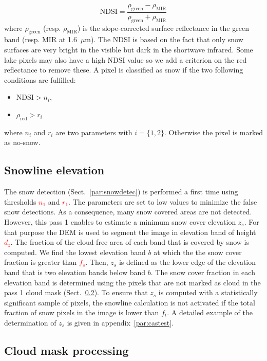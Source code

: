 \documentclass[a4paper]{article}
\begin{document}
\begin{equation}
\mathrm{NDSI} = \frac{\rho_\mathrm{green}-\rho_\mathrm{MIR}}{\rho_\mathrm{green}+\rho_\mathrm{MIR}}
\end{equation}
where $\rho_\mathrm{green}$ (resp. $\rho_\mathrm{MIR}$) is the slope-corrected surface reflectance in the green band (resp. MIR at 1.6~$\mu$m). The NDSI is based on the fact that only snow surfaces are very bright in the visible but dark in the shortwave infrared. Some lake pixels may also have a high NDSI value so we add a criterion on the red reflectance to remove these. A pixel is classified as snow if the two following conditions are fulfilled:
\begin{itemize}
 \item $\mathrm{NDSI} > n_i$,
 \item $\rho_\mathrm{red} > r_i$
\end{itemize}
where $n_i$ and $r_i$ are two parameters with $i=\{1,2\}$. Otherwise the pixel is marked as no-snow. 


\subsection{Snowline elevation}

The snow detection (Sect.~\ref{par:snowdetec}) is performed a first time using thresholds \textcolor{red}{$n_1$} and \textcolor{red}{$r_1$}. The parameters are set to low values to minimize the false snow detections. As a consequence, many snow covered areas are not detected. However, this pass 1 enables to estimate a minimum snow cover elevation $z_s$. For that purpose the DEM is used to segment the image in elevation band of height \textcolor{red}{$d_z$}. The fraction of the cloud-free area of each band that is covered by snow is computed. We find the lowest elevation band $b$ at which the the snow cover fraction is greater than \textcolor{red}{$f_s$}. Then, $z_s$ is defined as the lower edge of the elevation band that is two elevation bands below band $b$. The snow cover fraction in each elevation band is determined using the pixels that are not marked as cloud in the pass 1 cloud mask (Sect.~\ref{par:cloud}). To ensure that $z_s$ is computed with a statistically significant sample of pixels, the snowline calculation is not activated if the total fraction of snow pixels in the image is lower than $f_t$. A detailed example of the determination of $z_s$ is given in appendix~\ref{par:castest}.

\subsection{Cloud mask processing}\label{par:cloud}
\end{document}
